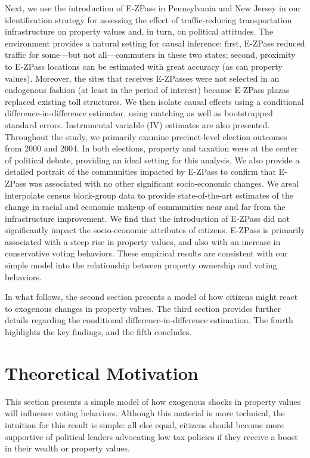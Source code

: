 \documentclass[11.0pt]{article}
\theoremstyle{definition}
\begin{document}
Next, we use the introduction of E-ZPass in Pennsylvania and New Jersey in our identification strategy for assessing the effect of traffic-reducing transportation infrastructure on property values and, in turn, on political attitudes. The environment provides a natural setting for causal inference: first, E-ZPass reduced traffic for some---but not all---commuters in these two states; second, proximity to E-ZPass locations can be estimated with great accuracy (as can property values). Moreover, the sites that receives E-ZPasses were not selected in an endogenous fashion (at least in the period of interest) because E-ZPass plazas replaced existing toll structures. We then isolate causal effects using a conditional difference-in-difference estimator, using matching as well as bootstrapped standard errors. Instrumental variable (IV) estimates are also presented. Throughout the study, we primarily examine precinct-level election outcomes from 2000 and 2004. In both elections, property and taxation were at the center of political debate, providing an ideal setting for this analysis. We also provide a detailed portrait of the communities impacted by E-ZPass to confirm that E-ZPass was associated with no other significant socio-economic changes. We areal interpolate census block-group data to provide state-of-the-art estimates of the change in racial and economic makeup of communities near and far from the infrastructure improvement. We find that the introduction of E-ZPass did not significantly impact the socio-economic attributes of citizens. E-ZPass is primarily associated with a steep rise in property values, and also with an increase in conservative voting behaviors. These empirical results are consistent with our simple model into the relationship between property ownership and voting behaviors. 

In what follows, the second section presents a model of how citizens might react to exogenous changes in property values. The third section provides further details regarding the conditional difference-in-difference estimation. The fourth highlights the key findings, and the fifth concludes. 



\section{Theoretical Motivation}
This section presents a simple model of how exogenous shocks in property values will influence voting behaviors. Although this material is more technical, the intuition for this result is simple: all else equal, citizens should become more supportive of political leaders advocating low tax policies if they receive a boost in their wealth or property values. 
\end{document}
